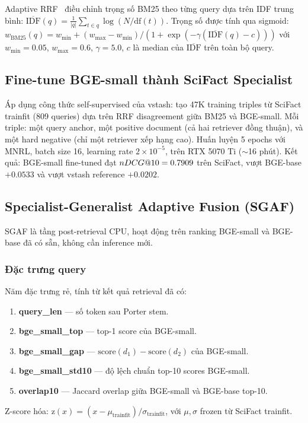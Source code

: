 Adaptive RRF~\citep{steffens2026vstash} điều chỉnh trọng số BM25 theo từng query dựa trên IDF trung bình:
$\overline{\text{IDF}}(q) = \frac{1}{|q|} \sum_{t \in q} \log(N / \text{df}(t))$. Trọng số được tính
qua sigmoid: $w_{\text{BM25}}(q) = w_{\min} + (w_{\max} - w_{\min}) / (1 + \exp(-\gamma(\overline{\text{IDF}}(q) - c)))$
với $w_{\min}=0.05$, $w_{\max}=0.6$, $\gamma=5.0$, $c$ là median của $\overline{\text{IDF}}$ trên
toàn bộ query.

\subsection{Fine-tune BGE-small thành SciFact Specialist}
\label{sec:method:specialist}

Áp dụng công thức self-supervised của vstash: tạo 47K training triples từ SciFact trainfit (809 queries)
dựa trên RRF disagreement giữa BM25 và BGE-small. Mỗi triple: một query anchor, một positive document
(cả hai retriever đồng thuận), và một hard negative (chỉ một retriever xếp hạng cao). Huấn luyện 5
epochs với MNRL, batch size 16, learning rate $2 \times 10^{-5}$, trên RTX 5070 Ti ($\sim$16 phút).
Kết quả: BGE-small fine-tuned đạt $nDCG@10 = 0.7909$ trên SciFact, vượt BGE-base $+0.0533$ và vượt
vstash reference $+0.0202$.

\subsection{Specialist-Generalist Adaptive Fusion (SGAF)}
\label{sec:method:sgaf}

SGAF là tầng post-retrieval CPU, hoạt động trên ranking BGE-small và BGE-base đã có sẵn, không cần
inference mới.

\subsubsection{Đặc trưng query}
\label{sec:method:features}

Năm đặc trưng rẻ, tính từ kết quả retrieval đã có:
\begin{enumerate}[leftmargin=2em,itemsep=1pt]
  \item \textbf{query\_len} --- số token sau Porter stem.
  \item \textbf{bge\_small\_top} --- top-1 score của BGE-small.
  \item \textbf{bge\_small\_gap} --- $\text{score}(d_1) - \text{score}(d_2)$ của BGE-small.
  \item \textbf{bge\_small\_std10} --- độ lệch chuẩn top-10 scores BGE-small.
  \item \textbf{overlap10} --- Jaccard overlap giữa BGE-small và BGE-base top-10.
\end{enumerate}
Z-score hóa: $\mathrm{z}(x) = (x - \mu_{\text{trainfit}}) / \sigma_{\text{trainfit}}$, với $\mu, \sigma$
frozen từ SciFact trainfit.

